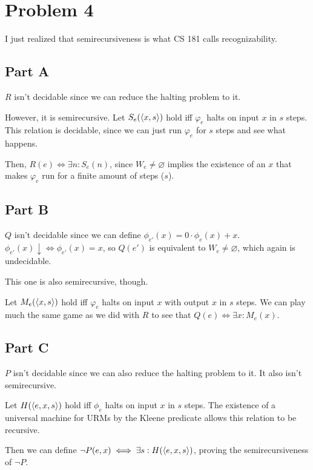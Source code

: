 \documentclass[12pt]{article}
\begin{document}
\pagebreak

\section{Problem 4}

I just realized that semirecursiveness is what CS 181 calls recognizability.

\subsection{Part A}

$R$ isn't decidable since we can reduce the halting problem to it.

However, it is semirecursive.
Let $S_e(\Braket{x, s})$ hold iff $\varphi_e$ halts on input $x$ in $s$ steps.
This relation is decidable, since we can just run $\varphi_e$ for $s$ steps and see what happens.

Then, $R(e) \iff \exists n: S_e(n)$, since $W_e \neq \varnothing$ implies
the existence of an $x$ that makes $\varphi_e$ run for a finite amount of steps ($s$).

\subsection{Part B}

$Q$ isn't decidable since we can define $\phi_{e'}(x)=0 \cdot \phi_e(x) + x$.
$\phi_{e'}(x)\downarrow \iff \phi_{e'}(x)=x$,
so $Q(e')$ is equivalent to $W_e \ne \varnothing$, which again is undecidable.

This one is also semirecursive, though.

Let $M_e(\Braket{x, s})$ hold iff $\varphi_e$ halts on input $x$ with output $x$ in $s$ steps.
We can play much the same game as we did with $R$ to see that $Q(e) \iff \exists x: M_e(x)$.

\subsection{Part C}

$P$ isn't decidable since we can also reduce the halting problem to it.
It also isn't semirecursive.

Let $H(\braket{e, x, s})$ hold iff $\phi_e$ halts on input $x$ in $s$ steps.
The existence of a universal machine for URMs by the Kleene predicate
allows this relation to be recursive.

Then we can define $\lnot P(e, x) \iff \exists s: H(\braket{e, x, s})$, proving the semirecursiveness of $\lnot P$.
\end{document}
